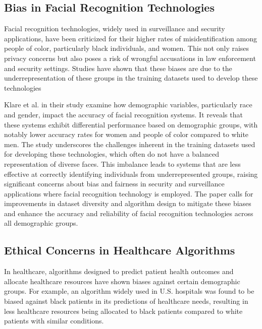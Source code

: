 \subsection{Bias in Facial Recognition Technologies}
Facial recognition technologies, widely used in surveillance and security applications, have been criticized for their higher rates of misidentification among people of color, particularly black individuals, and women. This not only raises privacy concerns but also poses a risk of wrongful accusations in law enforcement and security settings. Studies have shown that these biases are due to the underrepresentation of these groups in the training datasets used to develop these technologies \cite{Buolamwini_Gebru_2018}

Klare et al. \cite{Klare_Burge_Klontz_Vorder_Bruegge_Jain_2012} in their study examine how demographic variables, particularly race and gender, impact the accuracy of facial recognition systems. It reveals that these systems exhibit differential performance based on demographic groups, with notably lower accuracy rates for women and people of color compared to white men. The study underscores the challenges inherent in the training datasets used for developing these technologies, which often do not have a balanced representation of diverse faces. This imbalance leads to systems that are less effective at correctly identifying individuals from underrepresented groups, raising significant concerns about bias and fairness in security and surveillance applications where facial recognition technology is employed. The paper calls for improvements in dataset diversity and algorithm design to mitigate these biases and enhance the accuracy and reliability of facial recognition technologies across all demographic groups.

\subsection{Ethical Concerns in Healthcare Algorithms}
In healthcare, algorithms designed to predict patient health outcomes and allocate healthcare resources have shown biases against certain demographic groups. For example, an algorithm widely used in U.S. hospitals was found to be biased against black patients in its predictions of healthcare needs, resulting in less healthcare resources being allocated to black patients compared to white patients with similar conditions. \cite{Obermeyer_Powers_Vogeli_Mullainathan_2019}

